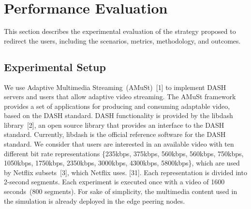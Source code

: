 \section{Performance Evaluation}
\label{sec:results}

This section describes the experimental evaluation of the strategy proposed to redirect the users, including the scenarios, metrics, methodology, and outcomes.
 
%

\subsection{Experimental Setup}


We use Adaptive Multimedia Streaming~(AMuSt)~[1] to implement DASH servers and users that allow adaptive video streaming. The AMuSt framework provides a set of applications for producing and consuming adaptable video, based on the DASH standard. DASH functionality is provided by the libdash library~[2], an open source library that provides an interface to the DASH standard. Currently, libdash is the official reference software for the DASH standard. We consider that users are interested in an available video with ten different bit rate representations \{235kbps, 375kbps, 560kbps, 560kbps, 750kbps, 1050kbps, 1750kbps, 2350kbps, 3000kbps, 4300kbps, 5800kbps\}, which are used by Netflix subsets~[3], which Netflix uses. [31]. Each representation is divided into 2-second segments. Each experiment is executed once with a video of 1600 seconds~(800 segments). 
For sake of simplicity, the multimedia content used in the simulation is already deployed in the edge peering nodes. 

